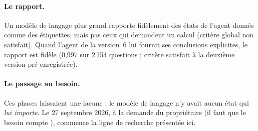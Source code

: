 \documentclass[11pt,a4paper]{article}
\begin{document}
\paragraph{Le rapport.} Un modèle de langage plus grand rapporte fidèlement des
états de l'agent donnés comme des étiquettes, mais pas ceux qui demandent un
calcul (critère global non satisfait). Quand l'agent de la version~6 lui fournit
ses conclusions explicites, le rapport est fidèle (0,997 sur 2\,154 questions ;
critère satisfait à la deuxième version pré-enregistrée).

\paragraph{Le passage au besoin.} Ces phases laissaient une lacune : le modèle de
langage n'y avait aucun état qui \emph{lui importe}. Le 27 septembre 2026, à la
demande du propriétaire (\og il faut que le besoin compte \fg{}), commence la
ligne de recherche présentée ici.
\end{document}
